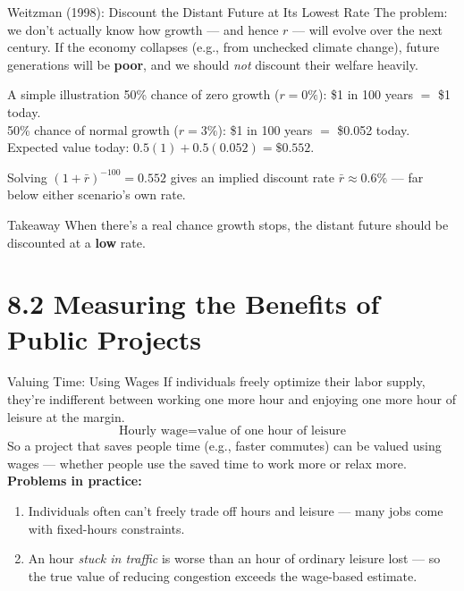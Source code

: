 \documentclass[11pt,aspectratio=169]{beamer}
\begin{document}
\begin{frame}{Weitzman (1998): Discount the Distant Future at Its Lowest Rate}
  The problem: we don't actually know how growth --- and hence $r$ --- will evolve over the next century. If the economy collapses (e.g., from unchecked climate change), future generations will be \textbf{poor}, and we should \emph{not} discount their welfare heavily.
  \begin{block}{A simple illustration}
    50\% chance of zero growth ($r=0\%$): \$1 in 100 years $=$ \$1 today.\\
    50\% chance of normal growth ($r=3\%$): \$1 in 100 years $=$ \$0.052 today.\\
    Expected value today: $0.5(1) + 0.5(0.052) = \$0.552$.
  \end{block}
  Solving $(1+\bar r)^{-100} = 0.552$ gives an implied discount rate $\bar r \approx 0.6\%$ --- far below either scenario's own rate.
  \begin{alertblock}{Takeaway}
    When there's a real chance growth stops, the distant future should be discounted at a \textbf{low} rate.
  \end{alertblock}
\end{frame}

\section{8.2 Measuring the Benefits of Public Projects}

\begin{frame}{Valuing Time: Using Wages}
  If individuals freely optimize their labor supply, they're indifferent between working one more hour and enjoying one more hour of leisure at the margin.
  \[ \text{Hourly wage} = \text{value of one hour of leisure} \]
  \vspace{0.3em}
  So a project that saves people time (e.g., faster commutes) can be valued using wages --- whether people use the saved time to work more or relax more.
  \vspace{0.4em}
  \small \textbf{Problems in practice:}
  \begin{enumerate}
    \item Individuals often can't freely trade off hours and leisure --- many jobs come with fixed-hours constraints.
    \item An hour \emph{stuck in traffic} is worse than an hour of ordinary leisure lost --- so the true value of reducing congestion exceeds the wage-based estimate.
  \end{enumerate}
\end{frame}
\end{document}

